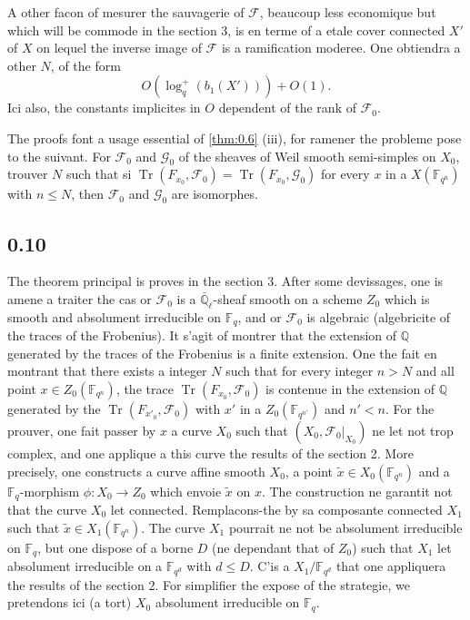 \documentclass[11pt,a4paper]{article}
\theoremstyle{plain}
\theoremstyle{definition}
\DeclareMathOperator{\tr}{Tr}
\begin{document}
A other facon of mesurer the sauvagerie of $\mathcal{F}$, beaucoup less economique but which will be commode in the section 3, is en terme of a etale cover connected $X'$ of $X$ on lequel the inverse image of $\mathcal{F}$ is a ramification moderee. One obtiendra a other $N$, of the form
\begin{equation}\label{eq:0.9.2}
O(\log_q^+(b_1(X'))) + O(1).
\end{equation}
Ici also, the constants implicites in $O$ dependent of the rank of $\mathcal{F}_0$.

The proofs font a usage essential of \ref{thm:0.6} (iii), for ramener the probleme pose to the suivant. For $\mathcal{F}_0$ and $\mathcal{G}_0$ of the sheaves of Weil smooth semi-simples on $X_0$, trouver $N$ such that si $\tr(F_{x_0},\mathcal{F}_0) = \tr(F_{x_0},\mathcal{G}_0)$ for every $x$ in a $X(\mathbb{F}_{q^n})$ with $n \leq N$, then $\mathcal{F}_0$ and $\mathcal{G}_0$ are isomorphes.

\subsection*{0.10}

The theorem principal is proves in the section 3. After some devissages, one is amene a traiter the cas or $\mathcal{F}_0$ is a $\overline{\mathbb{Q}}_\ell$-sheaf smooth on a scheme $Z_0$ which is smooth and absolument irreducible on $\mathbb{F}_q$, and or $\mathcal{F}_0$ is algebraic (algebricite of the traces of the Frobenius). It s'agit of montrer that the extension of $\mathbb{Q}$ generated by the traces of the Frobenius is a finite extension. One the fait en montrant that there exists a integer $N$ such that for every integer $n > N$ and all point $x \in Z_0(\mathbb{F}_{q^n})$, the trace $\tr(F_{x_0}, \mathcal{F}_0)$ is contenue in the extension of $\mathbb{Q}$ generated by the $\tr(F_{x'_0}, \mathcal{F}_0)$ with $x'$ in a $Z_0(\mathbb{F}_{q^{n'}})$ and $n' < n$. For the prouver, one fait passer by $x$ a curve $X_0$ such that $(X_0, \mathcal{F}_0|_{X_0})$ ne let not trop complex, and one applique a this curve the results of the section 2. More precisely, one constructs a curve affine smooth $X_0$, a point $\tilde{x} \in X_0(\mathbb{F}_{q^n})$ and a $\mathbb{F}_q$-morphism $\phi: X_0 \to Z_0$ which envoie $\tilde{x}$ on $x$. The construction ne garantit not that the curve $X_0$ let connected. Remplacons-the by sa composante connected $X_1$ such that $\tilde{x} \in X_1(\mathbb{F}_{q^n})$. The curve $X_1$ pourrait ne not be absolument irreducible on $\mathbb{F}_q$, but one dispose of a borne $D$ (ne dependant that of $Z_0$) such that $X_1$ let absolument irreducible on a $\mathbb{F}_{q^d}$ with $d \leq D$. C'is a $X_1/\mathbb{F}_{q^d}$ that one appliquera the results of the section 2. For simplifier the expose of the strategie, we pretendons ici (a tort) $X_0$ absolument irreducible on $\mathbb{F}_q$.
\end{document}
